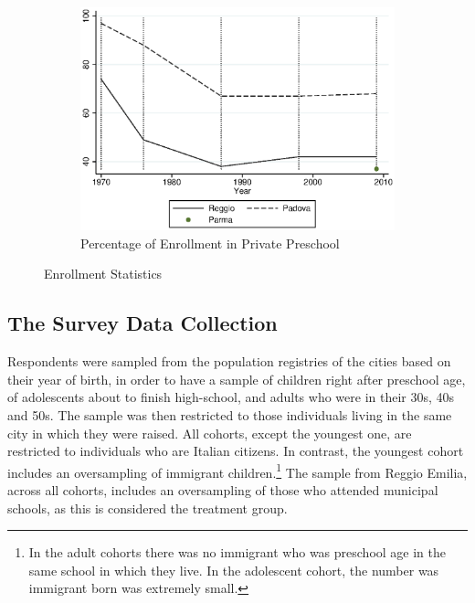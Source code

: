\begin{figure}[H]
\begin{subfigure}[ht]{0.48\textwidth}
        \includegraphics[width=\textwidth]{../../output/image/enroll_per_priv_graph.eps}
        \caption{Percentage of Enrollment in Private Preschool}
        \label{fig:large}
      \end{subfigure}
      \caption{Enrollment Statistics}  \label{fig:enrollment}
    \end{figure}


\subsection{The Survey Data Collection}

Respondents were sampled from the population registries of the cities based on their year of birth, in order to have a sample of children right after preschool age, of adolescents about to finish high-school, and adults who were in their 30s, 40s and 50s. The sample was then restricted to those individuals living in the same city in which they were raised. All cohorts, except the youngest one, are restricted to individuals who are Italian citizens. In contrast, the youngest cohort includes an oversampling of immigrant children.\footnote{In the adult cohorts there was no immigrant who was preschool age in the same school in which they live. In the adolescent cohort, the number was immigrant born was extremely small.} The sample from Reggio Emilia, across all cohorts, includes an oversampling of those who attended municipal schools, as this is considered the treatment group.

